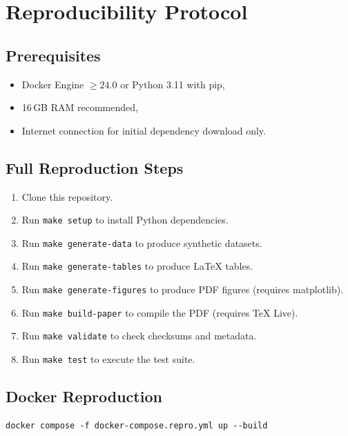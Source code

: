 \section{Reproducibility Protocol}
\label{app:reproducibility-protocol}

\subsection{Prerequisites}

\begin{itemize}
  \item Docker Engine $\geq 24.0$ or Python 3.11 with pip,
  \item 16\,GB RAM recommended,
  \item Internet connection for initial dependency download only.
\end{itemize}

\subsection{Full Reproduction Steps}

\begin{enumerate}
  \item Clone this repository.
  \item Run \texttt{make setup} to install Python dependencies.
  \item Run \texttt{make generate-data} to produce synthetic datasets.
  \item Run \texttt{make generate-tables} to produce LaTeX tables.
  \item Run \texttt{make generate-figures} to produce PDF figures (requires
    matplotlib).
  \item Run \texttt{make build-paper} to compile the PDF (requires TeX Live).
  \item Run \texttt{make validate} to check checksums and metadata.
  \item Run \texttt{make test} to execute the test suite.
\end{enumerate}

\subsection{Docker Reproduction}

\begin{verbatim}
docker compose -f docker-compose.repro.yml up --build
\end{verbatim}

